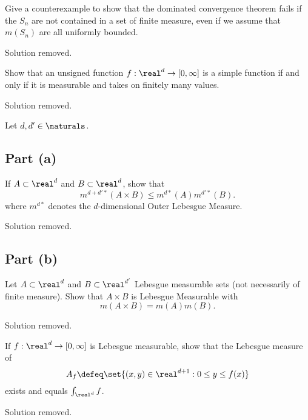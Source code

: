 \documentclass{article}
\begin{document}
Give a counterexample to show that the dominated convergence theorem fails if the $S_n$ are not contained in a set of finite measure, even if we assume that $m(S_n)$ are all uniformly bounded.

\begin{solution}
    Solution removed.
\end{solution}

\problemsec

Show that an unsigned function $f:\real^d\to[0,\infty]$ is a simple function if and only if it is measurable and takes on finitely many values.

\begin{solution}
    Solution removed.
\end{solution}

\problemsec

Let $d,d'\in \naturals$.

\subsection{Part (a)}

If $A\subset \real^d$ and $B\subset \real^d$, show that
\[
    m^{d+d'*}(A\times B)\le m^{d*}(A)m^{d'*}(B).
\]
where $m^{d*}$ denotes the $d$-dimensional Outer Lebesgue Measure.

\begin{solution}
    Solution removed.
\end{solution}

\subsection{Part (b)}
Let $A\subset \real^d$ and $B\subset \real^{d'}$ Lebesgue measurable sets (not necessarily of finite measure).
Show that $A\times B$ is Lebesgue Measurable with
\[
    m(A\times B)=m(A)m(B).
\]

\begin{solution}
    Solution removed.
\end{solution}

\problemsec

If $f:\real^d\to [0,\infty]$ is Lebesgue measurable, show that the Lebesgue measure of
\[
    A_f \defeq \set{(x,y)\in \real^{d+1} : 0\le y \le f(x)}
\]
exists and equals $\int_{\real^d} f$.

\begin{solution}
    Solution removed.
\end{solution}
\end{document}
